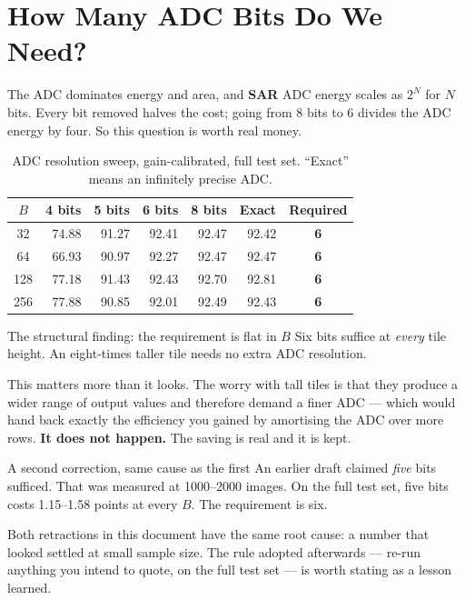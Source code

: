 \documentclass[11pt,a4paper]{report}
\newcommand{\jargon}[1]{\textcolor{acc}{\textbf{#1}}}
\begin{document}
\chapter{How Many ADC Bits Do We Need?}

The ADC dominates energy and area, and \jargon{SAR} ADC energy scales as
$2^N$ for $N$ bits. Every bit removed halves the cost; going from 8 bits to 6
divides the ADC energy by four. So this question is worth real money.

\begin{table}[h]
\centering
\caption{ADC resolution sweep, gain-calibrated, full test set. ``Exact'' means
an infinitely precise ADC.}
\begin{tabular}{crrrrrc}
\toprule
$B$ & 4 bits & 5 bits & 6 bits & 8 bits & Exact & Required \\
\midrule
32  & 74.88 & 91.27 & 92.41 & 92.47 & 92.42 & \textbf{6} \\
64  & 66.93 & 90.97 & 92.27 & 92.47 & 92.47 & \textbf{6} \\
128 & 77.18 & 91.43 & 92.43 & 92.70 & 92.81 & \textbf{6} \\
256 & 77.88 & 90.85 & 92.01 & 92.49 & 92.43 & \textbf{6} \\
\bottomrule
\end{tabular}
\end{table}

\begin{keybox}{The structural finding: the requirement is flat in $B$}
Six bits suffice at \emph{every} tile height. An eight-times taller tile needs
no extra ADC resolution.

This matters more than it looks. The worry with tall tiles is that they
produce a wider range of output values and therefore demand a finer ADC ---
which would hand back exactly the efficiency you gained by amortising the ADC
over more rows. \textbf{It does not happen.} The saving is real and it is
kept.
\end{keybox}

\begin{warnbox}{A second correction, same cause as the first}
An earlier draft claimed \emph{five} bits sufficed. That was measured at
1000--2000 images. On the full test set, five bits costs 1.15--1.58 points at
every $B$. The requirement is six.

Both retractions in this document have the same root cause: a number that
looked settled at small sample size. The rule adopted afterwards --- re-run
anything you intend to quote, on the full test set --- is worth stating as a
lesson learned.
\end{warnbox}
\end{document}
